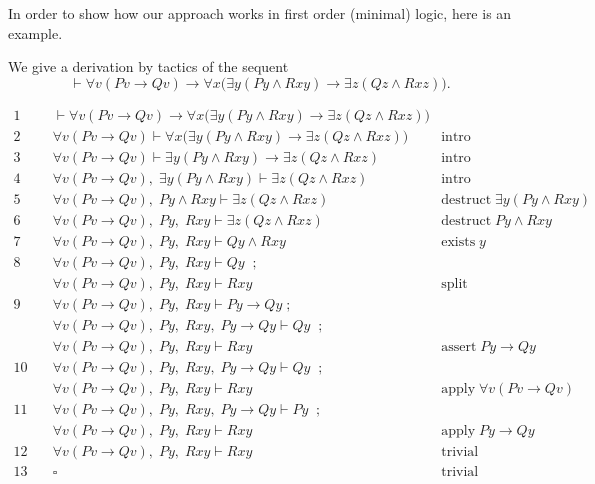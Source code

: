 \documentclass[a4paper,UKenglish]{lipics}
\begin{document}
In order to show how our approach works in first order (minimal) logic, here is an example.

\begin{example}
We give a derivation by tactics of the sequent 
\[
\vdash \forall v (Pv \rightarrow Qv) \rightarrow \forall x \big(\exists y (P y \wedge Rxy) \rightarrow \exists z (Qz \wedge Rxz)\big).
\]

 \[
 \begin{array}{rll}
 1\quad & \vdash \forall v (Pv \rightarrow Qv) \rightarrow \forall x \big(\exists y (P y \wedge Rxy) \rightarrow \exists z (Qz \wedge Rxz)\big)
 &  \\ 
 2\quad & \forall v (Pv \rightarrow Qv) \vdash \forall x \big(\exists y (P y \wedge Rxy) \rightarrow \exists z (Qz \wedge Rxz)\big)
 &  \mbox{intro} \\ 
 3\quad & \forall v (Pv \rightarrow Qv) \vdash \exists y (P y \wedge Rxy) \rightarrow \exists z (Qz \wedge Rxz)
 &  \mbox{intro} \\ 
 4\quad & \forall v (Pv \rightarrow Qv),\; \exists y (P y \wedge Rxy) \vdash  \exists z (Qz \wedge Rxz)
 &  \mbox{intro} \\ 
 5\quad & \forall v (Pv \rightarrow Qv),\; P y \wedge Rxy \vdash  \exists z (Qz \wedge Rxz)
 &  \mbox{destruct} \;\exists y (P y \wedge Rxy)\\ 
 6\quad & \forall v (Pv \rightarrow Qv),\; P y ,\; Rxy \vdash  \exists z (Qz \wedge Rxz)
 &  \mbox{destruct} \; Py \wedge Rxy\\ 
 7\quad & \forall v (Pv \rightarrow Qv),\; P y ,\; Rxy \vdash  Qy \wedge Rxy
 &  \mbox{exists} \;y \\ 
 8\quad & \forall v (Pv \rightarrow Qv),\; P y ,\; Rxy \vdash  Qy  \;\; ; \;\; \\
&          \forall v (Pv \rightarrow Qv),\; P y ,\; Rxy \vdash  Rxy 
 &  \mbox{split} \\ 
 9\quad & \forall v (Pv \rightarrow Qv),\; P y ,\; Rxy \vdash  Py \rightarrow Qy \; ;\\
&
          \forall v (Pv \rightarrow Qv),\; P y ,\; Rxy,\; Py \rightarrow Qy \vdash  Qy  \;\; ; \;\; \\
&          \forall v (Pv \rightarrow Qv),\; P y ,\; Rxy \vdash  Rxy 
 &  \mbox{assert} \;Py\rightarrow Qy \\ 
10\quad & 
          \forall v (Pv \rightarrow Qv),\; P y ,\; Rxy,\; Py \rightarrow Qy \vdash  Qy  \;\; ; \;\; \\
&          \forall v (Pv \rightarrow Qv),\; P y ,\; Rxy \vdash  Rxy 
 &  \mbox{apply} \;\forall v(Pv\rightarrow Qv) \\ 
11\quad & 
          \forall v (Pv \rightarrow Qv),\; P y ,\; Rxy,\; Py \rightarrow Qy \vdash  Py  \;\; ; \;\; \\
&          \forall v (Pv \rightarrow Qv),\; P y ,\; Rxy \vdash  Rxy 
 &  \mbox{apply} \;Py\rightarrow Qy \\ 
12\quad & 
                   \forall v (Pv \rightarrow Qv),\; P y ,\; Rxy \vdash  Rxy 
 &  \mbox{trivial} \\ 
13\quad & \square & \mbox{trivial}
 \end{array}\]
\end{example}
\end{document}
